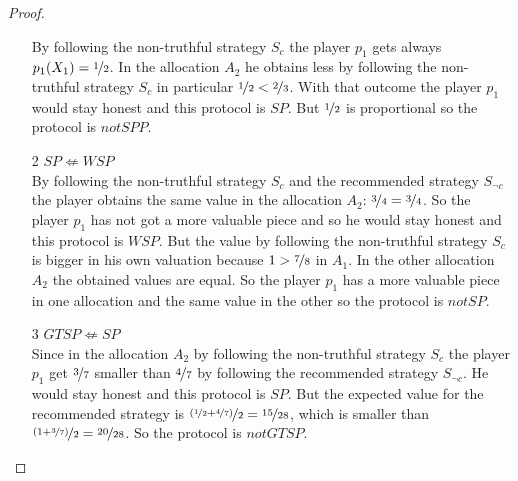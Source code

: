 \begin{proof}
\begin{enumerate}
By following the non-truthful strategy $S_c$ the player $p_1$ gets always $p_1(X_1)=\nicefrac{1}{2}$. In the allocation $A_2$ he obtains less by following the non-truthful strategy $S_c$ in particular $\nicefrac{1}{2} < \nicefrac{2}{3}$. With that outcome the player $p_1$ would stay honest and this protocol is $SP$. But $\nicefrac{1}{2}$ is proportional so the protocol is $notSPP$. 
\item[2] $SP \not\Leftarrow WSP$\\
By following the non-truthful strategy $S_c$ and the recommended strategy $S_{\neg c}$ the player obtains the same value in the allocation $A_2$: $\nicefrac{3}{4} = \nicefrac{3}{4}$. So the player $p_1$ has not got a more valuable piece and so he would stay honest and this protocol is $WSP$. But the value by following the non-truthful strategy $S_c$ is bigger in his own valuation because $1 > \nicefrac{7}{8}$ in $A_1$. In the other allocation $A_2$ the obtained values are equal. So the player $p_1$ has a more valuable piece in one allocation and the same value in the other so the protocol is $notSP$.
\item[3] $GTSP \not\Leftarrow SP$\\
Since in the allocation $A_2$ by following the non-truthful strategy $S_c$ the player $p_1$ get $\nicefrac{3}{7}$ smaller than $\nicefrac{4}{7}$ by following the recommended strategy $S_{\neg c}$. He would stay honest and this protocol is $SP$. But the expected value for the recommended strategy is $\nicefrac{(\nicefrac{1}{2}+\nicefrac{4}{7})}{2}=\nicefrac{15}{28}$, which is smaller than $\nicefrac{(1+\nicefrac{3}{7})}{2}=\nicefrac{20}{28}$. So the protocol is $notGTSP$. 
\end{enumerate}
\end{proof}

